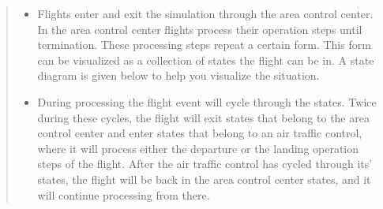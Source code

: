\documentclass[10pt]{article}
\begin{document}
\begin{quote}
\begin{itemize}
    \item Flights enter and exit the simulation through the area control center. In the area control center flights process their operation steps until termination. These processing steps repeat a certain form. This form can be visualized as a collection of states the flight can be in. A state diagram is given below to help you visualize the situation.
    
    \item During processing the flight event will cycle through the states. Twice during these cycles, the flight will exit states that belong to the area control center and enter states that belong to an air traffic control, where it will process either the departure or the landing operation steps of the flight. After the air traffic control has cycled through its' states, the flight will be back in the area control center states, and it will continue processing from there. 

    \end{itemize}

\begin{center}
\end{center}
\end{quote}
\end{document}
